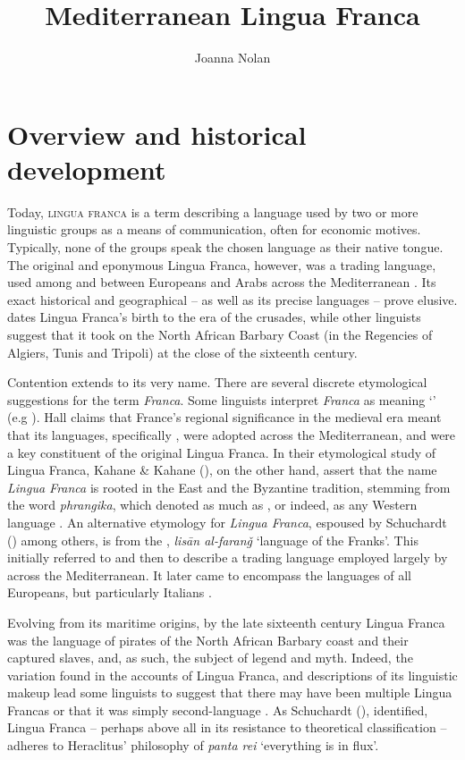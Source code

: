 \documentclass[output=paper]{langsci/langscibook}
\title{Mediterranean Lingua Franca}
\author{Joanna Nolan\affiliation{SOAS University of London}}
\begin{document}
	
\section{Overview and historical development}
	
	Today, \textsc{lingua franca} is a term describing a language used by two or more linguistic groups as a means of communication, often for economic motives. Typically, none of the groups speak the chosen language as their native tongue. The original and eponymous Lingua Franca, however, was a trading language, used among and between Europeans and Arabs across the Mediterranean \citep{KahaneKahane1976}. Its exact historical and geographical  – as well as its precise  languages – prove elusive. \citet{Hall1966} dates Lingua Franca’s birth to the era of the crusades, while other linguists \citep{Minervini1996,Cifoletti2004} suggest that it took  on the North African Barbary Coast (in the Regencies of Algiers, Tunis and Tripoli) at the close of the sixteenth century. 
	
	Contention extends to its very name. There are several discrete etymological suggestions for the term \textit{Franca}.  Some linguists interpret \textit{Franca} as meaning ‘’ (e.g \citealt[3]{Hall1966}). Hall claims that France’s regional significance in the medieval era meant that its languages, specifically , were adopted across the Mediterranean, and were a key constituent of the original Lingua Franca. In their etymological study of Lingua Franca, Kahane \& Kahane (\citeyear[25]{KahaneKahane1976}), on the other hand, assert that the name \textit{Lingua Franca} is rooted in the East and the Byzantine tradition, stemming from the  word \textit{phrangika}, which denoted  as much as , or indeed, as any Western language \citep[31]{KahaneKahane1976}. An alternative etymology for \textit{Lingua Franca}, espoused by Schuchardt (\citeyear[74]{Schuchardt1909}) among others, is from the , \textit{lisān al-faranǧ} ‘language of the Franks’. This initially referred to  and then to describe a trading language employed largely by  across the Mediterranean. It later came to encompass the languages of all Europeans, but particularly Italians \citep[26]{KahaneKahane1976}.  
	
	Evolving from its maritime origins, by the late sixteenth century Lingua Franca was the language of pirates of the North African Barbary coast and their captured slaves, and, as such, the subject of legend and myth. Indeed, the variation found in the accounts of Lingua Franca, and descriptions of its linguistic makeup lead some linguists \citep{Minervini1996,Mori2016} to suggest that there may have been multiple Lingua Francas or that it was simply second-language . As Schuchardt (\citeyear[88]{Schuchardt1909}), identified, Lingua Franca – perhaps above all in its resistance to theoretical classification – adheres to Heraclitus’ philosophy of \textit{panta rei}  ‘everything is in flux’. 
	
\end{document}
